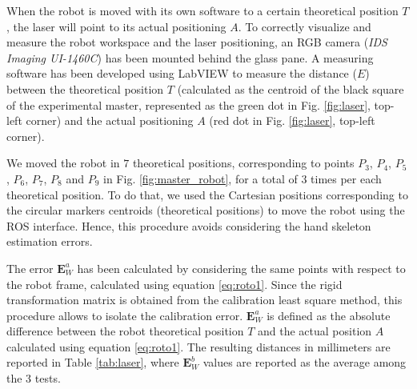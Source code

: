\documentclass[a4paper, 10 pt, conference]{ieeeconf}      %
\begin{document}
When the robot is moved with its own software to a certain theoretical position $T$, the laser will point to its actual positioning $A$. To correctly visualize and measure the robot workspace and the laser positioning, an RGB camera (\textit{IDS Imaging UI-1460C}) has been mounted behind the glass pane.
A measuring software has been developed using LabVIEW to measure the distance ($E$) between the theoretical position $T$ (calculated as the centroid of the black square of the experimental master, represented as the green dot in Fig. \ref{fig:laser}, top-left corner) and the actual positioning $A$ (red dot in Fig. \ref{fig:laser}, top-left corner).

We moved the robot in $7$ theoretical positions, corresponding to points $P_3$, $P_4$, $P_5$, $P_6$, $P_7$, $P_8$ and $P_9$ in Fig. \ref{fig:master_robot}, for a total of $3$ times per each theoretical position. To do that, we used the Cartesian positions corresponding to the circular markers centroids (theoretical positions) to move the robot using the ROS interface. Hence, this procedure avoids considering the hand skeleton estimation errors.

The error $\mathbf{E}^a_{W}$ has been calculated by considering the same points with respect to the robot frame, calculated using equation \ref{eq:roto1}. Since the rigid transformation matrix is obtained from the calibration least square method, this procedure allows to isolate the calibration error. $\mathbf{E}^a_{W}$ is defined as the absolute difference between the robot theoretical position $T$ and the actual position $A$ calculated using equation \ref{eq:roto1}.
The resulting distances in millimeters are reported in Table \ref{tab:laser}, where $\mathbf{E}^b_{W}$ values are reported as the average among the 3 tests.
\end{document}
